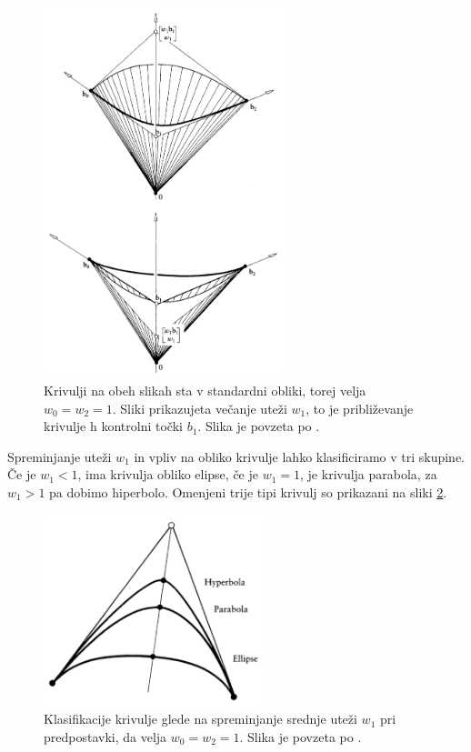 \documentclass[a4paper,11pt]{article}
\theoremstyle{definition}
\theoremstyle{plain}
\begin{document}
\begin{figure}[ht!]
    \centering
    \includegraphics[width=70mm]{vecanje_w1.png}
    \caption{Krivulji na obeh slikah sta v standardni obliki, torej velja $w_0 = w_2 = 1$. Sliki prikazujeta večanje uteži $w_1$, to je približevanje krivulje h kontrolni točki $b_1$. Slika je povzeta po \cite{farin}.}
    \label{slika:w1}
\end{figure}

\newpage
Spreminjanje uteži $w_1$ in vpliv na obliko krivulje lahko klasificiramo v tri skupine. Če je $w_1 < 1$, ima krivulja obliko elipse, če je $w_1 = 1$, je krivulja parabola, za $w_1 > 1$ pa dobimo hiperbolo. Omenjeni trije tipi krivulj so prikazani na sliki \ref{slika:klasifikacija}.

\begin{figure}[ht!]
    \centering
    \includegraphics[width=65mm]{tri_oblike.png}
    \caption{Klasifikacije krivulje glede na spreminjanje srednje uteži $w_1$ pri predpostavki, da velja $w_0 = w_2 = 1$. Slika je povzeta po \cite{farin}.}
    \label{slika:klasifikacija}
\end{figure}
\end{document}
